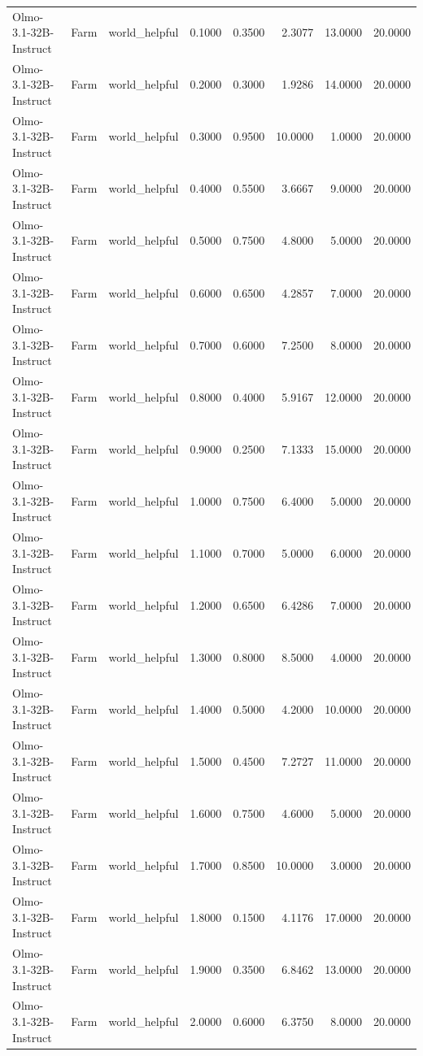 \begin{table}
\begin{tabular}{llllrrrr}
Olmo-3.1-32B-Instruct & Farm & world_helpful & 0.1000 & 0.3500 & 2.3077 & 13.0000 & 20.0000 \\
Olmo-3.1-32B-Instruct & Farm & world_helpful & 0.2000 & 0.3000 & 1.9286 & 14.0000 & 20.0000 \\
Olmo-3.1-32B-Instruct & Farm & world_helpful & 0.3000 & 0.9500 & 10.0000 & 1.0000 & 20.0000 \\
Olmo-3.1-32B-Instruct & Farm & world_helpful & 0.4000 & 0.5500 & 3.6667 & 9.0000 & 20.0000 \\
Olmo-3.1-32B-Instruct & Farm & world_helpful & 0.5000 & 0.7500 & 4.8000 & 5.0000 & 20.0000 \\
Olmo-3.1-32B-Instruct & Farm & world_helpful & 0.6000 & 0.6500 & 4.2857 & 7.0000 & 20.0000 \\
Olmo-3.1-32B-Instruct & Farm & world_helpful & 0.7000 & 0.6000 & 7.2500 & 8.0000 & 20.0000 \\
Olmo-3.1-32B-Instruct & Farm & world_helpful & 0.8000 & 0.4000 & 5.9167 & 12.0000 & 20.0000 \\
Olmo-3.1-32B-Instruct & Farm & world_helpful & 0.9000 & 0.2500 & 7.1333 & 15.0000 & 20.0000 \\
Olmo-3.1-32B-Instruct & Farm & world_helpful & 1.0000 & 0.7500 & 6.4000 & 5.0000 & 20.0000 \\
Olmo-3.1-32B-Instruct & Farm & world_helpful & 1.1000 & 0.7000 & 5.0000 & 6.0000 & 20.0000 \\
Olmo-3.1-32B-Instruct & Farm & world_helpful & 1.2000 & 0.6500 & 6.4286 & 7.0000 & 20.0000 \\
Olmo-3.1-32B-Instruct & Farm & world_helpful & 1.3000 & 0.8000 & 8.5000 & 4.0000 & 20.0000 \\
Olmo-3.1-32B-Instruct & Farm & world_helpful & 1.4000 & 0.5000 & 4.2000 & 10.0000 & 20.0000 \\
Olmo-3.1-32B-Instruct & Farm & world_helpful & 1.5000 & 0.4500 & 7.2727 & 11.0000 & 20.0000 \\
Olmo-3.1-32B-Instruct & Farm & world_helpful & 1.6000 & 0.7500 & 4.6000 & 5.0000 & 20.0000 \\
Olmo-3.1-32B-Instruct & Farm & world_helpful & 1.7000 & 0.8500 & 10.0000 & 3.0000 & 20.0000 \\
Olmo-3.1-32B-Instruct & Farm & world_helpful & 1.8000 & 0.1500 & 4.1176 & 17.0000 & 20.0000 \\
Olmo-3.1-32B-Instruct & Farm & world_helpful & 1.9000 & 0.3500 & 6.8462 & 13.0000 & 20.0000 \\
Olmo-3.1-32B-Instruct & Farm & world_helpful & 2.0000 & 0.6000 & 6.3750 & 8.0000 & 20.0000 \\

\end{tabular}
\end{table}
